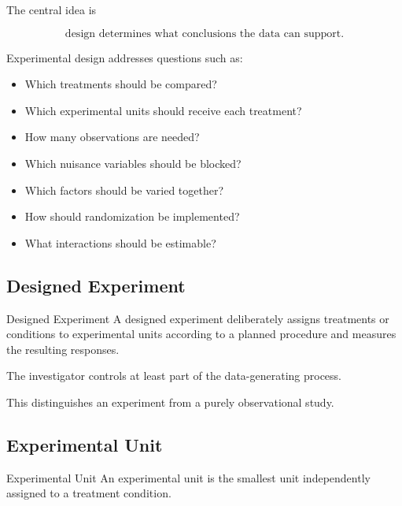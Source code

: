 The central idea is

\[
\boxed{
\text{design determines what conclusions the data can support}.
}
\]

Experimental design addresses questions such as:

\begin{itemize}
    \item Which treatments should be compared?
    \item Which experimental units should receive each treatment?
    \item How many observations are needed?
    \item Which nuisance variables should be blocked?
    \item Which factors should be varied together?
    \item How should randomization be implemented?
    \item What interactions should be estimable?
\end{itemize}

\subsection{Designed Experiment}
\label{subsec:designed-experiment}

\begin{definitionbox}{Designed Experiment}
A designed experiment deliberately assigns treatments or conditions to
experimental units according to a planned procedure and measures the
resulting responses.
\end{definitionbox}

The investigator controls at least part of the data-generating process.

This distinguishes an experiment from a purely observational study.

\subsection{Experimental Unit}
\label{subsec:experimental-unit-design}

\begin{definitionbox}{Experimental Unit}
An experimental unit is the smallest unit independently assigned to a
treatment condition.
\end{definitionbox}

